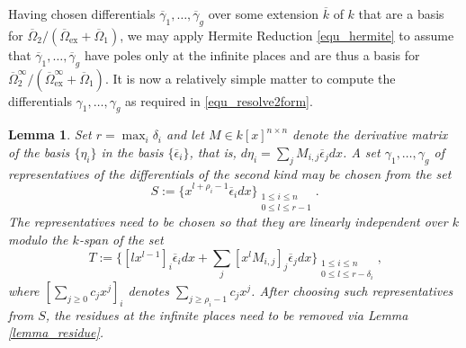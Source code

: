 \documentclass[12pt,reqno]{amsart}
\numberwithin{equation}{section}
\newtheorem{lemma}[theorem]{Lemma}
\newcommand{\op}[1]  { \operatorname{ #1 }}
\begin{document}
Having chosen differentials $\overline{\gamma}_1,\dots,\overline{\gamma}_g$ over some extension $\overline{k}$ of $k$ that are a basis for $\overline{\Omega}_2/(\overline{\Omega}_{\op{ex}}+\overline{\Omega}_1)$, we may apply Hermite Reduction \eqref{equ_hermite} to assume that $\overline{\gamma}_1,\dots,\overline{\gamma}_g$ have poles only at the infinite places and are thus a basis for $\overline{\Omega}_2^{\infty}/(\overline{\Omega}_{\op{ex}}^{\infty}+\overline{\Omega}_1)$. It is now a relatively simple matter to compute the differentials $\gamma_1,\dots,\gamma_g$ as required in \eqref{equ_resolve2form}.

\begin{lemma}
 Set $r=\max_i \delta_i$ and let $M\in k[x]^{n \times n}$ denote the derivative matrix of the basis $\{\eta_i\}$ in the basis $\{\overline{\epsilon}_i\}$, that is, $d \eta_i = \sum_{j} M_{i,j} \overline{\epsilon}_j dx$. A set $\gamma_1,\dots,\gamma_g$ of representatives of the differentials of the second kind may be chosen from the set
\begin{equation*}
 S:=\{x^{l+\rho_i-1} \overline{\epsilon}_i dx \}_{\substack{1 \le i \le n \\ 0 \le l \le r-1}}\text{.}
\end{equation*}
The representatives need to be chosen so that they are linearly independent over $k$ modulo the $k$-span of the set
\begin{equation*}
T:=\{[l x^{l-1}]_{i} \overline{\epsilon}_i dx + \sum_{j}  [x^{l} M_{i,j}]_j \overline{\epsilon}_j dx\}_{\substack{1 \le i \le n \\ 0 \le l \le r-\delta_i}}\text{,}
\end{equation*}
where $[\sum_{j \ge 0} c_j x^j]_i$ denotes $\sum_{j \ge \rho_i-1} c_j x^j$. After choosing such representatives from $S$, the residues at the infinite places need to be removed via Lemma \ref{lemma_residue}.
\end{lemma}
\end{document}
